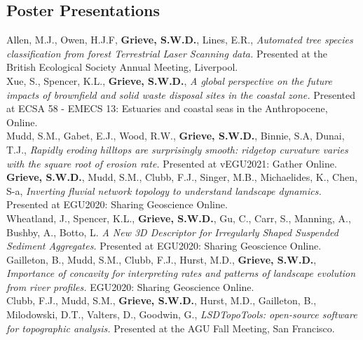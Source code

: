 \documentclass[10pt, a4paper]{article}
\newcommand{\student}{\textbf{\textsuperscript{\textdagger}}}
\newcommand{\years}[1]{\marginnote{\scriptsize #1}}
\begin{document}
\subsection*{Poster Presentations}

\years{2021}Allen, M.J.\student, Owen, H.J.F, \textbf{Grieve, S.W.D.}, Lines, E.R., \textit{Automated tree species classification from forest Terrestrial Laser Scanning data.} Presented at the British Ecological Society Annual Meeting, Liverpool.\\[0.05cm]

\years{2021}Xue, S.\student, Spencer, K.L., \textbf{Grieve, S.W.D.}, \textit{A global perspective on the future impacts of brownfield and solid waste disposal sites in the coastal zone.} Presented at ECSA 58 - EMECS 13: Estuaries and coastal seas in the Anthropocene, Online.\\[0.05cm]

\years{2021}Mudd, S.M., Gabet, E.J., Wood, R.W., \textbf{Grieve, S.W.D.}, Binnie, S.A, Dunai, T.J., \textit{Rapidly eroding hilltops are surprisingly smooth: ridgetop curvature varies with the square root of erosion rate.} Presented at vEGU2021: Gather Online.\\[0.05cm]

\years{2020}\textbf{Grieve, S.W.D.}, Mudd, S.M., Clubb, F.J., Singer, M.B., Michaelides, K., Chen, S-a, \textit{Inverting fluvial network topology to understand landscape dynamics.} Presented at EGU2020: Sharing Geoscience Online.\\[0.05cm]

\years{2020}Wheatland, J., Spencer, K.L., \textbf{Grieve, S.W.D.}, Gu, C., Carr, S., Manning, A., Bushby, A., Botto, L. \textit{A New 3D Descriptor for Irregularly Shaped Suspended Sediment Aggregates.} Presented at EGU2020: Sharing Geoscience Online.\\[0.05cm]

\years{2020}Gailleton, B., Mudd, S.M., Clubb, F.J., Hurst, M.D., \textbf{Grieve, S.W.D.}, \textit{Importance of concavity for interpreting rates and patterns of landscape evolution from river profiles.} EGU2020: Sharing Geoscience Online.\\[0.05cm]

\years{2019}Clubb, F.J., Mudd, S.M., \textbf{Grieve, S.W.D.}, Hurst, M.D., Gailleton, B., Milodowski, D.T., Valters, D., Goodwin, G., \textit{LSDTopoTools: open-source software for topographic analysis.} Presented at the AGU Fall Meeting, San Francisco.\\[0.05cm]
\end{document}

